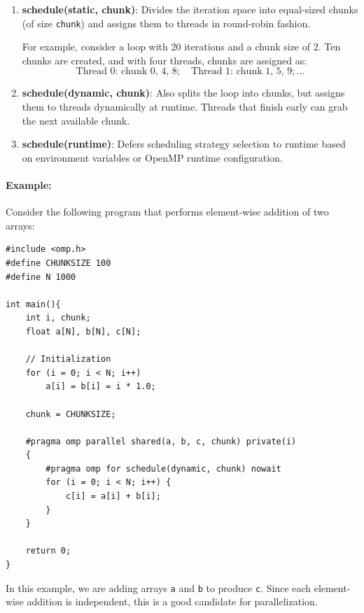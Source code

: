 \documentclass[12pt]{book}
\begin{document}
\begin{enumerate}
    \item \textbf{schedule(static, chunk)}: Divides the iteration space into equal-sized chunks (of size \texttt{chunk}) and assigns them to threads in round-robin fashion.
    
    For example, consider a loop with 20 iterations and a chunk size of 2. Ten chunks are created, and with four threads, chunks are assigned as:
    \[
    \text{Thread 0: } \text{chunk 0, 4, 8}; \quad \text{Thread 1: } \text{chunk 1, 5, 9}; \text{...}
    \]

    \item \textbf{schedule(dynamic, chunk)}: Also splits the loop into chunks, but assigns them to threads dynamically at runtime. Threads that finish early can grab the next available chunk.
    
    \item \textbf{schedule(runtime)}: Defers scheduling strategy selection to runtime based on environment variables or OpenMP runtime configuration.
\end{enumerate}

\paragraph{Example:} Consider the following program that performs element-wise addition of two arrays:

\begin{lstlisting}[style=cppstyle, caption={Addition of Two Arrays Using \texttt{for} Construct}, label={lst:for-example}]
#include <omp.h>
#define CHUNKSIZE 100
#define N 1000

int main(){
    int i, chunk;
    float a[N], b[N], c[N];

    // Initialization
    for (i = 0; i < N; i++)
        a[i] = b[i] = i * 1.0;

    chunk = CHUNKSIZE;

    #pragma omp parallel shared(a, b, c, chunk) private(i)
    {
        #pragma omp for schedule(dynamic, chunk) nowait
        for (i = 0; i < N; i++) {
            c[i] = a[i] + b[i];
        }
    }

    return 0;
}
\end{lstlisting}

In this example, we are adding arrays \texttt{a} and \texttt{b} to produce \texttt{c}. Since each element-wise addition is independent, this is a good candidate for parallelization.
\end{document}

